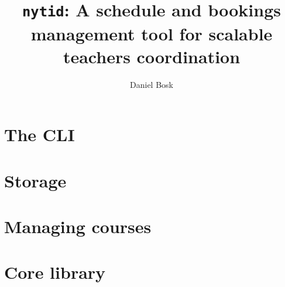 \documentclass[a4paper,oneside]{memoir}
\title{%
  \texttt{nytid}: A schedule and bookings management tool for scalable teachers 
  coordination
}
\author{%
  Daniel Bosk
}
\affil{%
  KTH EECS\\
  \texttt{dbosk@kth.se}
}
\begin{document}
\frontmatter
\maketitle
\thispagestyle{empty}

\begin{abstract}
  
\end{abstract}

\vspace*{\fill}
\clearpage

\tableofcontents
\clearpage

\mainmatter

\part{The CLI}



















\part{Storage}





\part{Managing courses}




\part{Core library}









\backmatter
\printbibliography
\end{document}
